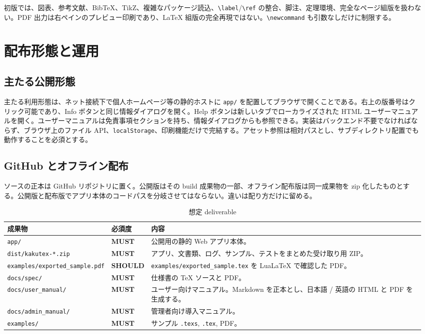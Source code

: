 \documentclass[11pt,a4paper]{ltjsarticle}
\newcommand{\MUST}{\textsf{\textbf{MUST}}}
\newcommand{\SHOULD}{\textsf{\textbf{SHOULD}}}
\newcommand{\code}[1]{\texttt{#1}}
\newcommand{\texs}{\code{.texs}}
\begin{document}
初版では、図表、参考文献、BibTeX、TikZ、複雑なパッケージ読込、\code{\textbackslash label}/\code{\textbackslash ref} の整合、脚注、定理環境、完全なページ組版を扱わない。PDF 出力は右ペインのプレビュー印刷であり、LaTeX 組版の完全再現ではない。\code{\textbackslash newcommand} も引数なしだけに制限する。

\section{配布形態と運用}

\subsection{主たる公開形態}

主たる利用形態は、ネット接続下で個人ホームページ等の静的ホストに \code{app/} を配置してブラウザで開くことである。右上の版番号はクリック可能であり、Info ボタンと同じ情報ダイアログを開く。Help ボタンは新しいタブでローカライズされた HTML ユーザーマニュアルを開く。ユーザーマニュアルは免責事項セクションを持ち、情報ダイアログからも参照できる。実装はバックエンド不要でなければならず、ブラウザ上のファイル API、\code{localStorage}、印刷機能だけで完結する。アセット参照は相対パスとし、サブディレクトリ配置でも動作することを必須とする。

\subsection{GitHub とオフライン配布}

ソースの正本は GitHub リポジトリに置く。公開版はその build 成果物の一部、オフライン配布版は同一成果物を zip 化したものとする。公開版と配布版でアプリ本体のコードパスを分岐させてはならない。違いは配り方だけに留める。

\begin{table}[h]
\centering
\caption{想定 deliverable}
\begin{tabularx}{\textwidth}{L{0.23\textwidth}L{0.16\textwidth}Y}
\toprule
{}
\textbf{成果物} & \textbf{必須度} & \textbf{内容} \\
\midrule
\code{app/} & \MUST & 公開用の静的 Web アプリ本体。\\
\code{dist/kakutex-*.zip} & \MUST & アプリ、文書類、ログ、サンプル、テストをまとめた受け取り用 ZIP。\\
\code{examples/exported\_sample.pdf} & \SHOULD & \code{examples/exported\_sample.tex} を LuaLaTeX で確認した PDF。\\
\code{docs/spec/} & \MUST & 仕様書の TeX ソースと PDF。\\
\code{docs/user\_manual/} & \MUST & ユーザー向けマニュアル。Markdown を正本とし、日本語 / 英語の HTML と PDF を生成する。\\
\code{docs/admin\_manual/} & \MUST & 管理者向け導入マニュアル。\\
\code{examples/} & \MUST & サンプル \texs, \code{.tex}, PDF。\\
\bottomrule
\end{tabularx}
\end{table}
\end{document}
